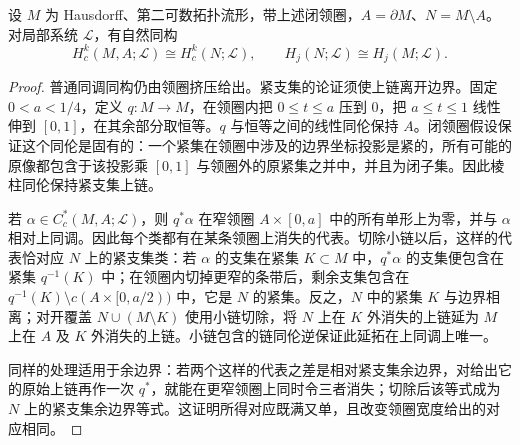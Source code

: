 \begin{lemma}\label{g2:lem:collar-support}
	设 \(M\) 为 Hausdorff、第二可数拓扑流形，带上述闭领圈，\(A=\partial M\)、\(N=M\setminus A\)。对局部系统 \(\mathcal L\)，有自然同构
	\[
		H_c^k(M,A;\mathcal L)\cong H_c^k(N;\mathcal L),
		\qquad H_j(N;\mathcal L)\cong H_j(M;\mathcal L).
	\]
\end{lemma}
\begin{proof}
	普通同调同构仍由领圈挤压给出。紧支集的论证须使上链离开边界。固定 \(0<a<1/4\)，定义 \(q:M\to M\)，在领圈内把 \(0\leq t\leq a\) 压到 \(0\)，把 \(a\leq t\leq1\) 线性伸到 \([0,1]\)，在其余部分取恒等。\(q\) 与恒等之间的线性同伦保持 \(A\)。闭领圈假设保证这个同伦是固有的：一个紧集在领圈中涉及的边界坐标投影是紧的，所有可能的原像都包含于该投影乘 \([0,1]\) 与领圈外的原紧集之并中，并且为闭子集。因此棱柱同伦保持紧支集上链。

	若 \(\alpha\in C_c^*(M,A;\mathcal L)\)，则 \(q^*\alpha\) 在窄领圈 \(A\times[0,a]\) 中的所有单形上为零，并与 \(\alpha\) 相对上同调。因此每个类都有在某条领圈上消失的代表。切除小链以后，这样的代表恰对应 \(N\) 上的紧支集类：若 \(\alpha\) 的支集在紧集 \(K\subset M\) 中，\(q^*\alpha\) 的支集便包含在紧集 \(q^{-1}(K)\) 中；在领圈内切掉更窄的条带后，剩余支集包含在 \(q^{-1}(K)\setminus c(A\times[0,a/2))\) 中，它是 \(N\) 的紧集。反之，\(N\) 中的紧集 \(K\) 与边界相离；对开覆盖 \(N\cup(M\setminus K)\) 使用小链切除，将 \(N\) 上在 \(K\) 外消失的上链延为 \(M\) 上在 \(A\) 及 \(K\) 外消失的上链。小链包含的链同伦逆保证此延拓在上同调上唯一。

	同样的处理适用于余边界：若两个这样的代表之差是相对紧支集余边界，对给出它的原始上链再作一次 \(q^*\)，就能在更窄领圈上同时令三者消失；切除后该等式成为 \(N\) 上的紧支集余边界等式。这证明所得对应既满又单，且改变领圈宽度给出的对应相同。
\end{proof}

